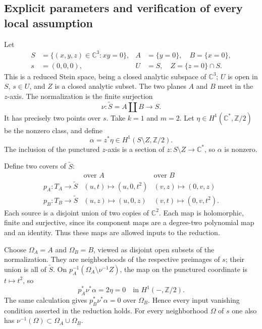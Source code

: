 \documentclass[10pt]{article}
\begin{document}
\subsection*{Explicit parameters and verification of every local assumption}
Let \[\begin{aligned}
 S&=\{(x,y,z)\in\mathbb C^3:xy=0\},&
 A&=\{y=0\},\quad B=\{x=0\},\\
 s&=(0,0,0),&
 U&=S,\quad Z=\{z=0\}\cap S .
\end{aligned}\] This is a reduced Stein space, being a closed analytic subspace of \(\mathbb C^3\); \(U\) is open in \(S\), \(s\in U\), and \(Z\) is a closed analytic subset. The two planes \(A\) and \(B\) meet in the \(z\)-axis. The normalization is the finite surjection \[\nu:\widetilde S=A\amalg B\longrightarrow S.\] It has precisely two points over \(s\). Take \(k=1\) and \(m=2\). Let \(\eta\in H^1(\mathbb C^*,\mathbb Z/2)\) be the nonzero class, and define \[\alpha=z^*\eta\in H^1(S\setminus Z,\mathbb Z/2).\] The inclusion of the punctured \(z\)-axis is a section of \(z:S\setminus Z\to\mathbb C^*\), so \(\alpha\) is nonzero.\par
Define two covers of \(\widetilde S\): \[\begin{array}{c|cc}
 &\text{over }A&\text{over }B\\ \hline
p_A:T_A\to\widetilde S &(u,t)\mapsto(u,0,t^2)&(v,z)\mapsto(0,v,z)\\
p_B:T_B\to\widetilde S &(u,z)\mapsto(u,0,z)&(v,t)\mapsto(0,v,t^2).
\end{array}\] Each source is a disjoint union of two copies of \(\mathbb C^2\). Each map is holomorphic, finite and surjective, since its component maps are a degree-two polynomial map and an identity. Thus these maps are allowed inputs to the reduction.\par
Choose \(\Omega_A=A\) and \(\Omega_B=B\), viewed as disjoint open subsets of the normalization. They are neighborhoods of the respective preimages of \(s\); their union is all of \(\widetilde S\). On \(p_A^{-1}(\Omega_A\setminus\nu^{-1}Z)\), the map on the punctured coordinate is \(t\mapsto t^2\), so \[p_A^*\nu^*\alpha=2\eta=0\quad\text{in }H^1(-,\mathbb Z/2).\] The same calculation gives \(p_B^*\nu^*\alpha=0\) over \(\Omega_B\). Hence every input vanishing condition asserted in the reduction holds. For every neighborhood \(\Omega\) of \(s\) one also has \(\nu^{-1}(\Omega)\subset\Omega_A\cup\Omega_B\).\par
\end{document}

